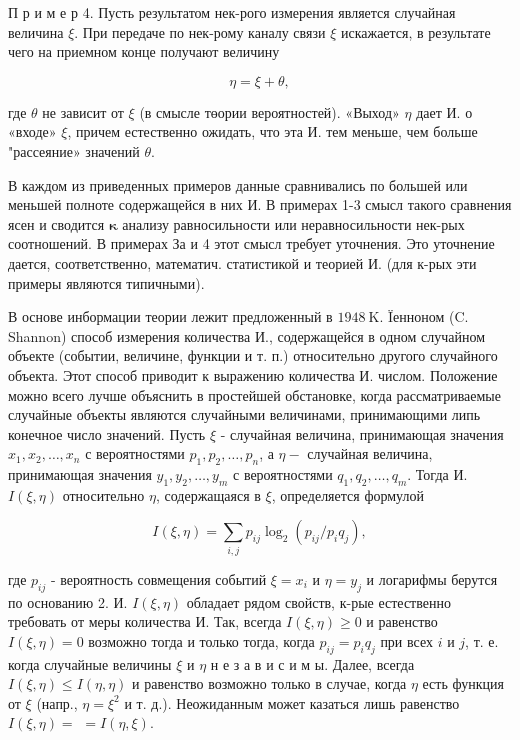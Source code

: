 \documentclass[10pt]{article}
\begin{document}
П р и м е р 4. Пусть результатом нек-рого измерения является случайная величина $\xi$. При передаче по нек-рому каналу связи $\xi$ искажается, в результате чего на приемном конце получают величину



\[

\eta=\xi+\theta,

\]



где $\theta$ не зависит от $\xi$ (в смысле төории вероятностей). «Выход» $\eta$ дает И. о «входе» $\xi$, причем естественно ожидать, что эта И. тем меньше, чем больше "рассеяние» значений $\theta$.



В каждом из приведенных примеров данные сравнивались по большей или меньшей полноте содержащейся в них И. В примерах 1-3 смысл такого сравнения ясен и сводится $\boldsymbol{\kappa}$ анализу равносильности или неравносильности нек-рых соотношений. В примерах За и 4 этот смысл требует уточнения. Это уточнение дается, соответственно, математич. статистикой и теорией И. (для к-рых эти примеры являются типичными).



В основе инбормации теории лежит предложенный в $1948 \mathrm{~K}$. Ïенноном (C. Shannon) способ измерения количества И., содержащейся в одном случайном объекте (событии, величине, функции и т. п.) относительно другого случайного объекта. Этот способ приводит к выражению количества И. числом. Положение можно всего лучше объяснить в простейшей обстановке, когда рассматриваемые случайные объекты являются случайными величинами, принимающими липь конечное число значений. Пусть $\xi$ - случайная величина, принимающая значения $x_{1}, x_{2}, \ldots, x_{n}$ с вероятностями $p_{1}, p_{2}, \ldots, p_{n}$, а $\eta-$ случайная величина, принимающая значения $y_{1}, y_{2}, \ldots, y_{m}$ с вероятностями $q_{1}, q_{2}, \ldots, q_{m}$. Тогда И. $I(\xi, \eta)$ относительно $\eta$, содержащаяся в $\xi$, определяется формулой



\[

I(\xi, \eta)=\sum_{i, j} p_{i j} \log _{2}\left(p_{i j} / p_{i} q_{j}\right),

\]



где $p_{i j}$ - вероятность совмещения событий $\xi=x_{i}$ и $\eta=y_{j}$ и логарифмы берутся по основанию 2. И. $I(\xi, \eta)$ обладает рядом свойств, к-рые естественно требовать от меры количества И. Так, всегда $I(\xi, \eta) \geqslant 0$ и равенство $I(\xi, \eta)=0$ возможно тогда и только тогда, когда $p_{i j}=p_{i} q_{j}$ при всех $i$ и $j$, т. е. когда случайные величины $\xi$ и $\eta$ н е з а в и с и м ы. Далее, всегда $I(\xi, \eta) \leqslant I(\eta, \eta)$ и равенство возможно только в случае, когда $\eta$ есть функция от $\xi$ (напр., $\eta=\xi^{2}$ и т. д.). Неожиданным может казаться лишь равенство $I(\xi, \eta)=$ $=I(\eta, \xi)$.
\end{document}

